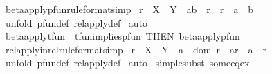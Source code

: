 \begin{isabellebody}
\isanewline
{}\isamarkupfalse%
\ beta{\isacharunderscore}apply{\isacharunderscore}pfun{\isacharbrackleft}rule{\isacharunderscore}format{\isacharcomma}simp{\isacharbrackright}{\isacharcolon}\ \isanewline
{\isachardoublequoteopen}r\ {\isacharcolon}\ {\isacharparenleft}X\ {\isacharminus}{\isacharbar}{\isacharminus}{\isachargreater}\ Y{\isacharparenright}\ {\isacharminus}{\isacharminus}{\isachargreater}\ {\isacharparenleft}a{\isacharcomma}b{\isacharparenright}\ {\isacharcolon}\ r\ {\isacharminus}{\isacharminus}{\isachargreater}\ {\isacharparenleft}r\ {\isacharpercent}{\isacharcircum}\ a{\isacharparenright}\ {\isacharequal}\ b{\isachardoublequoteclose}\isanewline
%
\isadelimproof
%
\endisadelimproof
%
\isatagproof
{}\isamarkupfalse%
\ {\isacharparenleft}unfold\ pfun{\isacharunderscore}def\ rel{\isacharunderscore}apply{\isacharunderscore}def{\isacharparenright}\isanewline
{}\isamarkupfalse%
\ auto\isanewline
{}\isamarkupfalse%
%
\endisatagproof
{\isafoldproof}%
%
\isadelimproof
\isanewline
%
\endisadelimproof
\isanewline
\isanewline
{}\isamarkupfalse%
\ beta{\isacharunderscore}apply{\isacharunderscore}tfun\ {\isacharequal}\ tfun{\isacharunderscore}implies{\isacharunderscore}pfun\ {\isacharbrackleft}THEN\ beta{\isacharunderscore}apply{\isacharunderscore}pfun{\isacharbrackright}\isanewline
\isanewline
\isanewline
{}\isamarkupfalse%
\ rel{\isacharunderscore}apply{\isacharunderscore}in{\isacharunderscore}rel{\isacharbrackleft}rule{\isacharunderscore}format{\isacharcomma}simp{\isacharbrackright}{\isacharcolon}\ \isanewline
{\isachardoublequoteopen}r\ {\isacharcolon}\ {\isacharparenleft}X\ {\isacharminus}{\isacharbar}{\isacharminus}{\isachargreater}\ Y{\isacharparenright}\ {\isacharminus}{\isacharminus}{\isachargreater}{\isacharparenleft}\ a\ {\isacharcolon}\ dom\ r{\isacharparenright}\ {\isacharminus}{\isacharminus}{\isachargreater}\ {\isacharparenleft}a{\isacharcomma}r\ {\isacharpercent}{\isacharcircum}\ a{\isacharparenright}\ {\isacharcolon}\ r{\isachardoublequoteclose}\isanewline
%
\isadelimproof
%
\endisadelimproof
%
\isatagproof
{}\isamarkupfalse%
\ {\isacharparenleft}unfold\ pfun{\isacharunderscore}def\ rel{\isacharunderscore}apply{\isacharunderscore}def{\isacharparenright}\isanewline
{}\isamarkupfalse%
\ {\isacharparenleft}auto{\isacharparenright}\isanewline
{}\isamarkupfalse%
\ {\isacharparenleft}simplesubst\ some{\isacharunderscore}eq{\isacharunderscore}ex{\isacharparenright}\isanewline
{}\isamarkupfalse%

\end{isabellebody}
